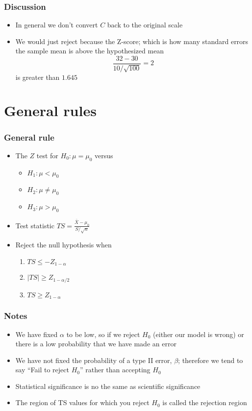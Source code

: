 \documentclass[aspectratio=169]{beamer}
\begin{document}
\begin{frame}\frametitle{Discussion}
\begin{itemize}
\item In general we don't convert $C$ back to the original scale
\item We would just reject because the Z-score; which is how many
  standard errors the sample mean is above the hypothesized mean
  $$
  \frac{32 - 30}{10 / \sqrt{100}} = 2
  $$
  is greater than $1.645$
\end{itemize}

\section{General rules}
\end{frame}
\begin{frame}\frametitle{General rule}
\begin{itemize}
\item The $Z$ test for $H_0:\mu = \mu_0$ versus 
  \begin{itemize}
  \item $H_1: \mu < \mu_0$
  \item $H_2: \mu \neq \mu_0$
  \item $H_3: \mu > \mu_0$ 
  \end{itemize}
 \item Test statistic $ TS = \frac{\bar{X} - \mu_0}{S / \sqrt{n}} $
 \item Reject the null hypothesis when 
  \begin{enumerate}[$H_1:$]
  \item $TS \leq -Z_{1 - \alpha}$
  \item $|TS| \geq Z_{1 - \alpha / 2}$
  \item $TS \geq Z_{1 - \alpha}$
  \end{enumerate}
\end{itemize}

\end{frame}
\begin{frame}\frametitle{Notes}
\begin{itemize}
\item We have fixed $\alpha$ to be low, so if we reject $H_0$ (either
  our model is wrong) or there is a low probability that we have made
  an error
\item We have not fixed the probability of a type II error, $\beta$;
  therefore we tend to say ``Fail to reject $H_0$'' rather than
  accepting $H_0$
\item Statistical significance is no the same as scientific
  significance
\item The region of TS values for which you reject $H_0$ is called the
  rejection region
\end{itemize}
\end{frame}
\end{document}
